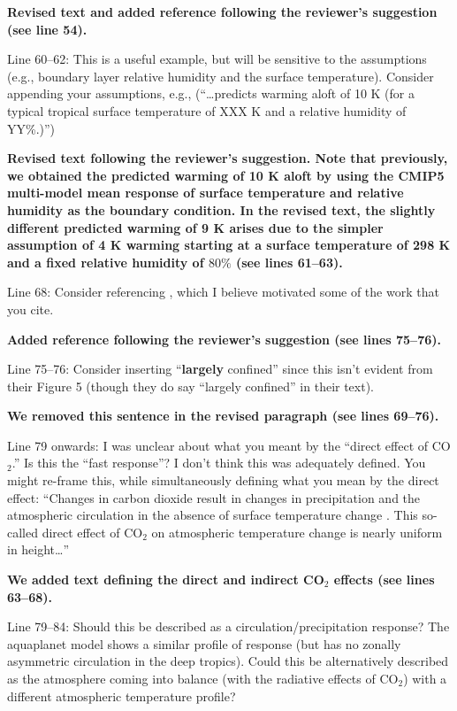 \documentclass[11pt]{article}
\begin{document}
\textbf{Revised text and added reference following the reviewer's suggestion (see line 54).}

Line 60--62: This is a useful example, but will be sensitive to the assumptions (e.g., boundary layer relative humidity and the surface temperature). Consider appending your assumptions, e.g., (``\ldots{}predicts warming aloft of 10 K (for a typical tropical surface temperature of XXX K and a relative humidity of YY\%.)'')

\textbf{Revised text following the reviewer's suggestion. Note that previously, we obtained the predicted warming of 10 K aloft by using the CMIP5 multi-model mean response of surface temperature and relative humidity as the boundary condition. In the revised text, the slightly different predicted warming of 9 K arises due to the simpler assumption of 4 K warming starting at a surface temperature of 298 K and a fixed relative humidity of \(80\%\) (see lines 61--63).}

Line 68: Consider referencing \cite{sobel_enso_2002}, which I believe motivated some of the work that you cite.

\textbf{Added reference following the reviewer's suggestion (see lines 75--76).}

Line 75--76: Consider inserting ``\textbf{largely} confined'' since this isn't evident from their Figure 5 (though they do say ``largely confined'' in their text).

\textbf{We removed this sentence in the revised paragraph (see lines 69--76).}

Line 79 onwards: I was unclear about what you meant by the ``direct effect of CO\(_2\).'' Is this the ``fast response''? I don't think this was adequately defined. You might re-frame this, while simultaneously defining what you mean by the direct effect: ``Changes in carbon dioxide result in changes in precipitation and the atmospheric circulation in the absence of surface temperature change \cite{bony_robust_2013}. This so-called direct effect of CO\(_2\) on atmospheric temperature change is nearly uniform in height\ldots{}''

\textbf{We added text defining the direct and indirect CO$_2$ effects (see lines 63--68).}

Line 79--84: Should this be described as a circulation/precipitation response? The aquaplanet model shows a similar profile of response (but has no zonally asymmetric circulation in the deep tropics). Could this be alternatively described as the atmosphere coming into balance (with the radiative effects of CO\(_2\)) with a different atmospheric temperature profile?
\end{document}
